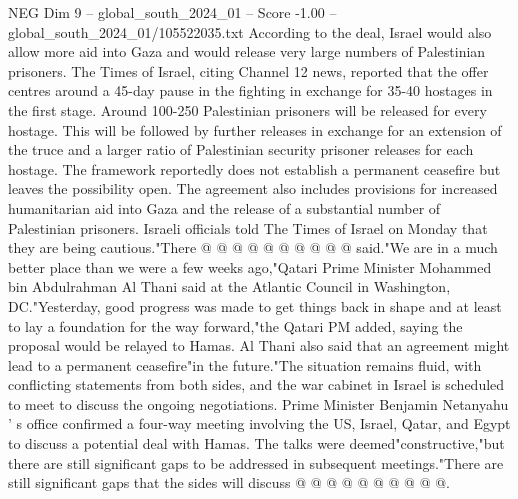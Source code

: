 \begin{textsample}{NEG Dim 9 – global\_south\_2024\_01 – Score -1.00 – global\_south\_2024\_01/105522035.txt}
According to the deal, Israel would also allow more aid into Gaza and would release very large numbers of Palestinian prisoners.
The Times of Israel, citing Channel 12 news, reported that the offer centres around a 45-day pause in the fighting in exchange for 35-40 hostages in the first stage.
Around 100-250 Palestinian prisoners will be released for every hostage.
This will be followed by further releases in exchange for an extension of the truce and a larger ratio of Palestinian security prisoner releases for each hostage.
The framework reportedly does not establish a permanent ceasefire but leaves the possibility open.
The agreement also includes provisions for increased humanitarian aid into Gaza and the release of a substantial number of Palestinian prisoners.
Israeli officials told The Times of Israel on Monday that they are being cautious."There @ @ @ @ @ @ @ @ @ @ said."We are in a much better place than we were a few weeks ago,"Qatari Prime Minister Mohammed bin Abdulrahman Al Thani said at the Atlantic Council in Washington, DC."Yesterday, good progress was made to get things back in shape and at least to lay a foundation for the way forward,"the Qatari PM added, saying the proposal would be relayed to Hamas.
Al Thani also said that an agreement might lead to a permanent ceasefire"in the future."The situation remains fluid, with conflicting statements from both sides, and the war cabinet in Israel is scheduled to meet to discuss the ongoing negotiations.
Prime Minister Benjamin Netanyahu ' s office confirmed a four-way meeting involving the US, Israel, Qatar, and Egypt to discuss a potential deal with Hamas.
The talks were deemed"constructive,"but there are still significant gaps to be addressed in subsequent meetings."There are still significant gaps that the sides will discuss @ @ @ @ @ @ @ @ @ @.

\end{textsample}
